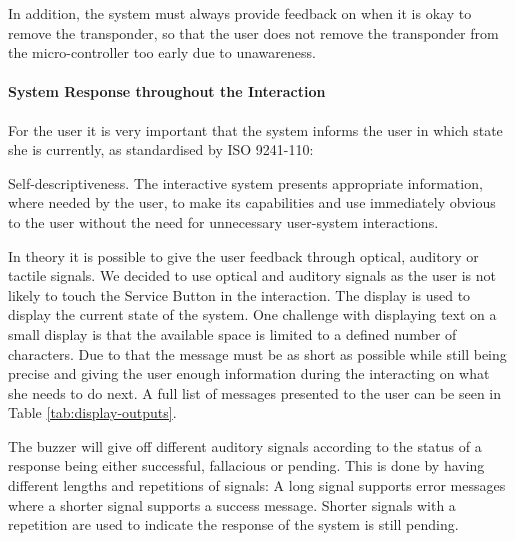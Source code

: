In addition, the system must always provide feedback on when it is okay to remove the transponder, so that the user does not remove the transponder from the micro-controller too early due to unawareness.

\paragraph{System Response throughout the Interaction}

For the user it is very important that the system informs the user in which state she is currently, as standardised by ISO 9241-110:

\begin{principle}{Self-descriptiveness.}
The interactive system presents appropriate information, where needed by the user, to make its capabilities and use immediately obvious to the user without the need for unnecessary user-system interactions. \cite{ISO:9241-110:2020}
\end{principle}

In theory it is possible to give the user feedback through optical, auditory or tactile signals. We decided to use optical and auditory signals as the user is not likely to touch the Service Button in the interaction. The display is used to display the current state of the system. One challenge with displaying text on a small display is that the available space is limited to a defined number of characters. Due to that the message must be as short as possible while still being precise and giving the user enough information during the interacting on what she needs to do next. A full list of messages presented to the user can be seen in Table \ref{tab:display-outputs}.

The buzzer will give off different auditory signals according to the status of a response being either successful, fallacious or pending. This is done by having different lengths and repetitions of signals: A long signal supports error messages where a shorter signal supports a success message. Shorter signals with a repetition are used to indicate the response of the system is still pending.

